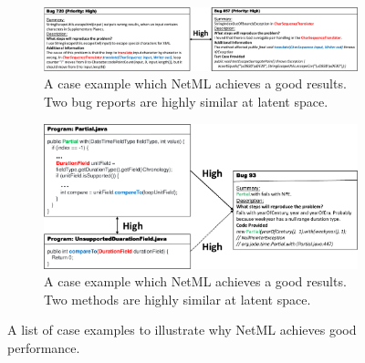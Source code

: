 \begin{figure}
	\centering
	\begin{subfigure}[b]{\textwidth}
		\centering
		\includegraphics[width=\textwidth]{bug_high_crop}
		\caption[]%
		{{\small A case example which NetML achieves a good results. Two bug reports are highly similar at latent space.}}    
		\label{fig:bug_high_crop}
	\end{subfigure}
	\centering
	\begin{subfigure}[b]{\textwidth}  
		\centering 
		\includegraphics[width=\textwidth]{method_high_crop.pdf}
		\caption[]%
		{{\small A case example which NetML achieves a good results. Two methods are highly similar at latent space.}}    
		\label{fig:method_high_crop}
	\end{subfigure}
	\caption[]
	{\small A list of case examples to illustrate why NetML achieves good performance.}
\label{fig:case_good_example}

\end{figure}

